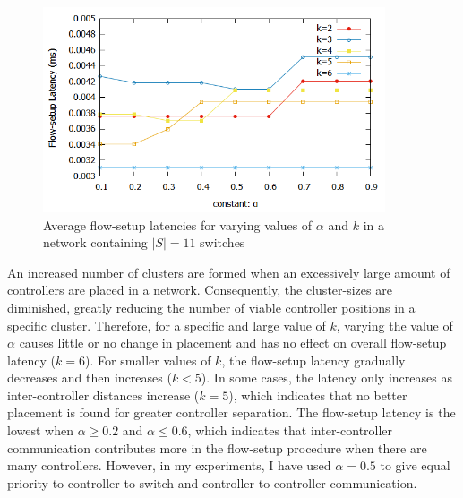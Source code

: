 \documentclass[preprint,12pt]{elsarticle}
\begin{document}
	\begin{figure}
		
		\centering
		\includegraphics[width=0.9\textwidth]{Images/Abilene_Analysis.png}
		\caption{Average flow-setup latencies for varying values of $\alpha$ and $k$ in a network containing $|S|=11$ switches} \label{fig:abileneA}
		
	\end{figure}

	An increased number of clusters are formed when an excessively large amount of controllers are placed in a network. Consequently, the cluster-sizes are diminished, greatly reducing the number of viable controller positions in a specific cluster. Therefore, for a specific and large value of $k$, varying the value of $\alpha$ causes little or no change in placement and has no effect on overall flow-setup latency ($k=6$). For smaller values of $k$, the flow-setup latency gradually decreases and then increases ($k<5$). In some cases, the latency only increases as inter-controller distances increase ($k=5$), which indicates that no better placement is found for greater controller separation. The flow-setup latency is the lowest when $\alpha \ge 0.2$ and $\alpha \le 0.6$, which indicates that inter-controller communication contributes more in the flow-setup procedure when there are many controllers. However, in my experiments, I have used $\alpha=0.5$ to give equal priority to controller-to-switch and controller-to-controller communication.
	
\end{document}
